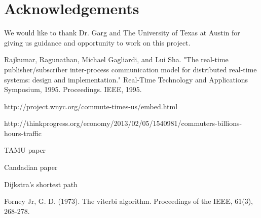 \documentclass[conference]{IEEEtran}
\begin{document}
\section{Acknowledgements}

We would like to thank Dr. Garg and The University of Texas at Austin for giving us guidance and opportunity to work on this project.

\begin{thebibliography}{1}

Rajkumar, Ragunathan, Michael Gagliardi, and Lui Sha. "The real-time publisher/subscriber inter-process communication model for distributed real-time systems: design and implementation." Real-Time Technology and Applications Symposium, 1995. Proceedings. IEEE, 1995.

http://project.wnyc.org/commute-times-us/embed.html

http://thinkprogress.org/economy/2013/02/05/1540981/commuters-billions-hours-traffic

\bibitem
TAMU paper

\bibitem
Candadian paper

Dijkstra's shortest path

Forney Jr, G. D. (1973). The viterbi algorithm. Proceedings of the IEEE, 61(3), 268-278.

\end{thebibliography}
\end{document}
